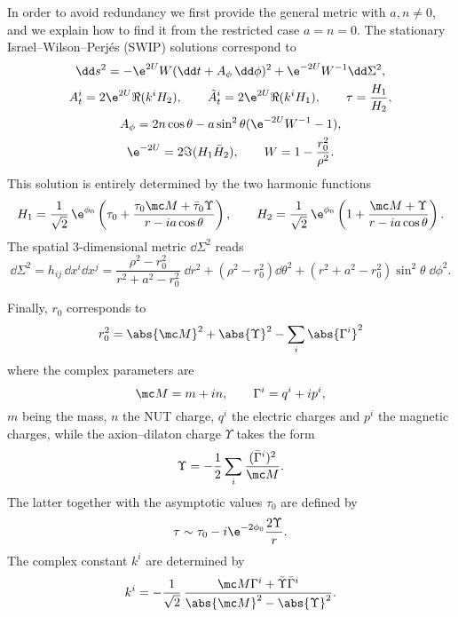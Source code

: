 In order to avoid redundancy we first provide the general metric with $a, n \neq 0$, and we explain how to find it from the restricted case $a = n = 0$.
The stationary Israel--Wilson--Perjés (SWIP) solutions correspond to
\begin{subequations}
\label{matter:eq:swip:solution}
\begin{gather}
	\dd s^2 = - \e^{2U} W (\dd t + A_\phi\, \dd \phi)^2 + \e^{-2U} W^{-1} \dd \Sigma^2, \\
	A^i_t = 2 \e^{2U} \Re(k^i H_2), \qquad
	\tilde A^i_t = 2 \e^{2U} \Re(k^i H_1), \qquad
	\tau = \frac{H_1}{H_2}, \\
	A_\phi = 2 n \cos \theta - a \sin^2 \theta (\e^{-2U} W^{-1} - 1), \\
	\e^{-2U} = 2 \Im(H_1 \bar H_2), \qquad
	W = 1 - \frac{r_0^2}{\rho^2}.
\end{gather}
\end{subequations}
This solution is entirely determined by the two harmonic functions
\begin{equation}
	\label{matter:eq:swip:harmonic-functions}
	H_1 = \frac{1}{\sqrt{2}}\, \e^{\phi_0} \left( \tau_0 + \frac{\tau_0 \mc M + \bar \tau_0 \Upsilon}{r - i a \cos \theta} \right), \qquad
	H_2 = \frac{1}{\sqrt{2}}\, \e^{\phi_0} \left( 1 + \frac{\mc M + \Upsilon}{r - i a \cos \theta} \right).
\end{equation} 
The spatial $3$-dimensional metric $\dd \Sigma^2$ reads
\begin{equation}
	\label{matter:metric:swip:flat-spatial}
	\dd\Sigma^2 = h_{ij}\, \dd x^i \dd x^j
		= \frac{\rho^2 - r_0^2}{r^2 + a^2 - r_0^2}\; \dd r^2 + (\rho^2 - r_0^2) \dd\theta^2 + (r^2 + a^2 - r_0^2) \sin^2 \theta\; \dd \phi^2.
\end{equation} 

Finally, $r_0$ corresponds to
\begin{equation}
	r_0^2 = \abs{\mc M}^2 + \abs{\Upsilon}^2 - \sum_i \abs{\Gamma^i}^2
\end{equation} 
where the complex parameters are
\begin{equation}
	\mc M = m + i n, \qquad
	\Gamma^i = q^i + i p^i,
\end{equation} 
$m$ being the mass, $n$ the NUT charge, $q^i$ the electric charges and $p^i$ the magnetic charges, while the axion--dilaton charge $\Upsilon$ takes the form
\begin{equation}
	\Upsilon = - \frac{1}{2} \sum_i \frac{(\bar \Gamma^i)^2}{\mc M}.
\end{equation} 
The latter together with the asymptotic values $\tau_0$ are defined by
\begin{equation}
	\tau \sim \tau_0 - i \e^{-2\phi_0} \frac{2 \Upsilon}{r}.
\end{equation} 
The complex constant $k^i$ are determined by
\begin{equation}
	k^i = - \frac{1}{\sqrt{2}}\, \frac{\mc M \Gamma^i + \bar \Upsilon \bar \Gamma^i}{\abs{\mc M}^2 - \abs{\Upsilon}^2}.
\end{equation} 

